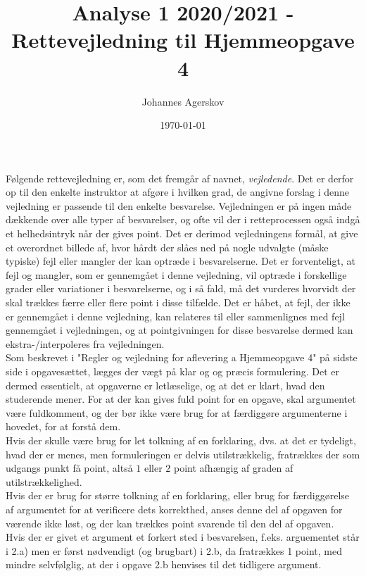 \documentclass{article}
\title{Analyse 1 2020/2021 - Rettevejledning til Hjemmeopgave 4}
\author{Johannes Agerskov}
\date{\today}
\begin{document}
	
	\maketitle
Følgende rettevejledning er, som det fremgår af navnet, \emph{vejledende}. Det er derfor op til den enkelte instruktor at afgøre i hvilken grad, de angivne forslag i denne vejledning er passende til den enkelte besvarelse. Vejledningen er på ingen måde dækkende over alle typer af besvarelser, og ofte vil der i retteprocessen også indgå et helhedsintryk når der gives point. Det er derimod vejledningens formål, at give et overordnet billede af, hvor hårdt der slåes ned på nogle udvalgte (måske typiske) fejl eller mangler der kan optræde i besvarelserne. Det er forventeligt, at fejl og mangler, som er gennemgået i denne vejledning, vil optræde i forskellige grader eller variationer i besvarelserne, og i så fald, må det vurderes hvorvidt der skal trækkes færre eller flere point i disse tilfælde. Det er håbet, at fejl, der ikke er gennemgået i denne vejledning, kan relateres til eller sammenlignes med fejl gennemgået i vejledningen, og at pointgivningen for disse besvarelse dermed kan ekstra-/interpoleres fra vejledningen.
\vspace*{0.5cm}\\
Som beskrevet i "Regler og vejledning for aflevering a Hjemmeopgave 4" på sidste side i opgavesættet, lægges der vægt på klar og og præcis formulering. Det er dermed essentielt, at opgaverne er letlæselige, og at det er klart, hvad den studerende mener. For at der kan gives fuld point for en opgave, skal argumentet være fuldkomment, og der bør ikke være brug for at færdiggøre argumenterne i hovedet, for at forstå dem.
\vspace*{0.2cm}
\\
Hvis der skulle være brug for let tolkning af en forklaring, dvs. at det er tydeligt, hvad der er menes, men formuleringen er delvis utilstrækkelig, fratrækkes der som udgangs punkt få point, altså $ 1 $ eller $ 2 $ point afhængig af graden af utilstrækkelighed.
\vspace*{0.2cm}\\
Hvis der er brug for større tolkning af en forklaring, eller brug for færdiggørelse af argumentet for at verificere dets korrekthed, anses denne del af opgaven for værende ikke løst, og der kan trækkes point svarende til den del af opgaven.
\vspace*{0.2cm}\\
Hvis der er givet et argument et forkert sted i besvarelsen, f.eks. arguementet står i 2.a) men er først nødvendigt (og brugbart) i 2.b, da fratrækkes 1 point, med mindre selvfølglig, at der i opgave 2.b henvises til det tidligere argument.
\end{document}
